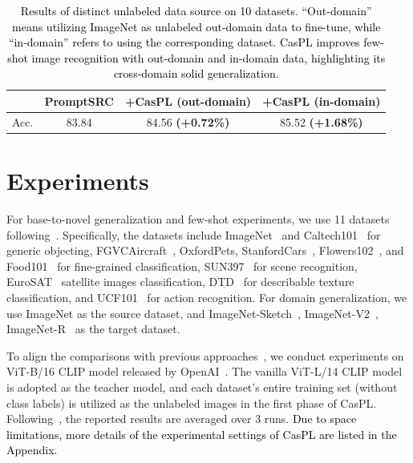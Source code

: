 \documentclass[runningheads]{llncs}
\newcommand{\rewrite}[1]{\textcolor{black}{#1}}%
\newcommand{\important}[1]{\textcolor{black}{#1}}
\newcommand{\improve}[1]{\textcolor{boost_line}{\textbf{#1}}}
\begin{document}
{{\begin{table}[t]
    \centering
    \caption{\rewrite{Results of distinct unlabeled data source on 10 datasets. ``Out-domain'' means utilizing ImageNet as unlabeled out-domain data to fine-tune, while ``in-domain'' refers to using the corresponding dataset. CasPL improves few-shot image recognition with out-domain and in-domain data, highlighting its cross-domain solid generalization.}}
    \label{table:diff-domain-dataset}
    \setlength{\tabcolsep}{10pt}
    \resizebox{0.85\linewidth}{!}
    {
        \begin{tabular}{l|lll}
                \hline
                & PromptSRC                 &  \textbf{+CasPL (out-domain)} &  \textbf{+CasPL (in-domain)} \\
                \hline
                Acc. & \multicolumn{1}{c}{83.84} & \multicolumn{1}{c}{84.56 \improve{(+0.72\%)}}   & \multicolumn{1}{c}{85.52 \improve{(+1.68\%)}} \\
                \hline
        \end{tabular}
    }
\end{table}


\section{Experiments}
For base-to-novel generalization and few-shot experiments, we use 11 datasets following~\cite{zhou2022learning, zhou2022conditional}. Specifically, the datasets include ImageNet~\cite{deng2009imagenet} and Caltech101~\cite{fei2004learning} for generic objecting, FGVCAircraft~\cite{maji2013fine}, OxfordPets, StanfordCars~\cite{krause20133d}, Flowers102~\cite{nilsback2008automated}, and Food101~\cite{bossard2014food} for fine-grained classification, SUN397~\cite{xiao2010sun} for scene recognition,  EuroSAT~\cite{helber2019eurosat} satellite images classification, DTD~\cite{cimpoi2014describing} for describable texture classification, and UCF101~\cite{soomro2012ucf101} for action recognition. For domain generalization, we use ImageNet as the source dataset, and ImageNet-Sketch~\cite{wang2019learning}, ImageNet-V2~\cite{recht2019imagenet}, ImageNet-R~\cite{hendrycks2021natural} as the target dataset.


To align the comparisons with previous approaches~\cite{zhou2022learning,zhou2022conditional,khattak2023maple,khattak2023self}, we conduct experiments on ViT-B/16 CLIP model released by OpenAI~\cite{radford2021learning}. The vanilla ViT-L/14 CLIP model is adopted as the teacher model, and each dataset's entire training set (without class labels) is utilized as the unlabeled images in the first phase of CasPL. Following~\cite{zhou2022conditional,zhou2022learning}, the reported results are averaged over 3 runs. 
\important{Due to space limitations, more details of the experimental settings of CasPL are listed in the Appendix. }


}}
\end{document}
